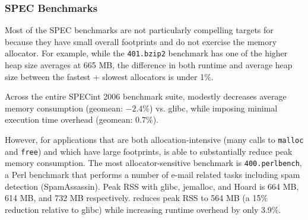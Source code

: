 
\subsubsection{SPEC Benchmarks}





Most of the SPEC benchmarks are not particularly compelling targets
for \Mesh because they have small overall footprints and do not
exercise the memory allocator. For example, while the
\texttt{401.bzip2} benchmark has one of the higher heap size averages
at 665 MB, the difference in both runtime and average heap size
between the fastest + slowest allocators is under 1\%.

Across the entire SPECint 2006 benchmark suite, \Mesh modestly
decreases average memory consumption (geomean: $-2.4$\%) vs. glibc,
while imposing minimal execution time overhead (geomean: 0.7\%).


However, for applications that are both allocation-intensive (many
calls to \texttt{malloc} and \texttt{free}) and which have large footprints,
\Mesh is able to substantially reduce peak memory consumption. The
most allocator-sensitive benchmark is \texttt{400.perlbench}, a Perl
benchmark that performs a number of e-mail related tasks including
spam detection (SpamAssassin). Peak RSS with glibc, jemalloc, and
Hoard is 664 MB, 614 MB, and 732 MB respectively. \Mesh reduces peak
RSS to 564 MB (a 15\% reduction relative to glibc) while increasing
runtime overhead by only 3.9\%.


